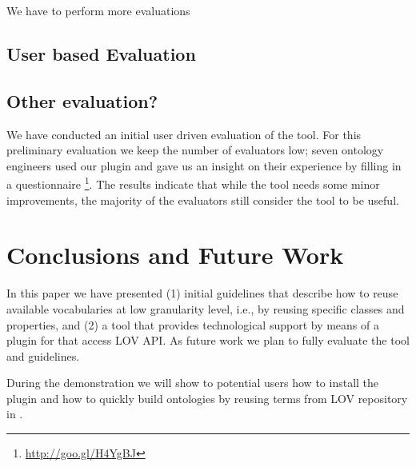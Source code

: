 We have to perform more evaluations

\subsection{User based Evaluation}

\subsection{Other evaluation?}

We have conducted an initial user driven evaluation of the tool. For this preliminary evaluation we keep the number of evaluators low; seven ontology engineers used our plugin and gave us an insight on their experience by filling in a questionnaire \footnote{\url{http://goo.gl/H4YgBJ}}. The results indicate that while the tool needs some minor improvements, the majority of the evaluators still consider the tool to be useful.

\vspace{-3mm}
\section{Conclusions and Future Work}\label{sec:conclusions}
In this paper we have presented (1) initial guidelines that describe how to reuse available vocabularies at low granularity level, i.e., by reusing specific classes and properties, and (2) a tool that provides technological support by means of a plugin for \protege that access LOV API. As future work we plan to fully evaluate the tool and guidelines.

During the demonstration we will show to potential users how to install the plugin and how to quickly build ontologies by reusing terms from LOV repository in \protege.

